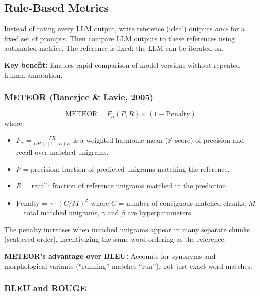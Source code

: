 \documentclass[11pt, a4paper]{article}
\begin{document}
\subsection{Rule-Based Metrics}

\begin{defbox}
Instead of rating every LLM output, write reference (ideal) outputs \emph{once} for a fixed set of prompts. Then compare LLM outputs to these references using automated metrics. The reference is fixed; the LLM can be iterated on.

\textbf{Key benefit:} Enables rapid comparison of model versions without repeated human annotation.
\end{defbox}

\subsubsection{METEOR (Banerjee \& Lavie, 2005)}

\begin{defbox}
\[
\text{METEOR} = F_{\alpha}(P, R) \times (1 - \text{Penalty})
\]
where:
\begin{itemize}[leftmargin=1.5em]
  \item $F_\alpha = \frac{PR}{\alpha P + (1-\alpha)R}$ is a weighted harmonic mean (F-score) of precision and recall over matched unigrams.
  \item $P$ = precision: fraction of predicted unigrams matching the reference.
  \item $R$ = recall: fraction of reference unigrams matched in the prediction.
  \item Penalty = $\gamma \cdot (C/M)^\beta$ where $C$ = number of contiguous matched chunks, $M$ = total matched unigrams, $\gamma$ and $\beta$ are hyperparameters.
\end{itemize}
The penalty increases when matched unigrams appear in many separate chunks (scattered order), incentivizing the same word ordering as the reference.

\textbf{METEOR's advantage over BLEU:} Accounts for synonyms and morphological variants (``running'' matches ``run''), not just exact word matches.
\end{defbox}

\subsubsection{BLEU and ROUGE}
\end{document}
